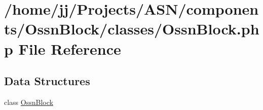 \hypertarget{_ossn_block_8php}{}\section{/home/jj/\+Projects/\+A\+S\+N/components/\+Ossn\+Block/classes/\+Ossn\+Block.php File Reference}
\label{_ossn_block_8php}
\subsection*{Data Structures}
\begin{DoxyCompactItemize}
\item 
class \hyperlink{class_ossn_block}{Ossn\+Block}
\end{DoxyCompactItemize}
